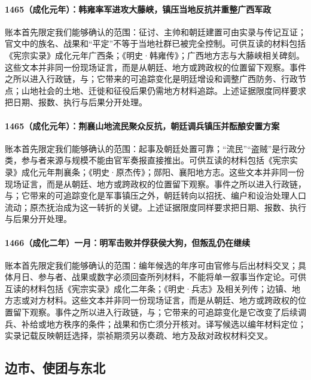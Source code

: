 \paragraph{1465（成化元年）：韩雍率军进攻大藤峡，镇压当地反抗并重整广西军政} 账本首先限定我们能够确认的范围：征讨、主帅和朝廷建置可由实录与传记互证；官文中的族名、战果和“平定”不等于当地社群已被完全控制。可供互读的材料包括《宪宗实录》成化元年广西条；《明史·韩雍传》；广西地方志与大藤峡相关碑刻。这些文本并非同一份现场证言，而是从朝廷、地方或跨政权的位置留下观察。事件之所以进入行政链，与；它带来的可追踪变化是明廷增设和调整广西防务、行政节点；山地社会的土地、迁徙和征役后果仍需地方材料追踪。上述证据限度同样要求把日期、报数、执行与后果分开处理。

\paragraph{1465（成化元年）：荆襄山地流民聚众反抗，朝廷调兵镇压并酝酿安置方案} 账本首先限定我们能够确认的范围：起事及朝廷处置可靠；“流民”“盗贼”是行政分类，参与者来源与规模不能由官军奏报直接推出。可供互读的材料包括《宪宗实录》成化元年荆襄条；《明史·原杰传》；郧阳、襄阳地方志。这些文本并非同一份现场证言，而是从朝廷、地方或跨政权的位置留下观察。事件之所以进入行政链，与；它带来的可追踪变化是军事镇压之外，朝廷转向以招抚、编户和设治处理人口流动；原杰抚治成为这一转折的关键。上述证据限度同样要求把日期、报数、执行与后果分开处理。

\paragraph{1466（成化二年）一月：明军击败并俘获侯大狗，但叛乱仍在继续} 账本首先限定我们能够确认的范围：编年候选的年序可由官修与后出材料交叉；具体月日、参与者、战果或数字必须回查所列材料，不能将单一叙事当作定论。可供互读的材料包括《宪宗实录》成化二年条；《明史·兵志》及相关列传；边镇、地方志或对方材料。这些文本并非同一份现场证言，而是从朝廷、地方或跨政权的位置留下观察。事件之所以进入行政链，与；它带来的可追踪变化是它改变了后续调兵、补给或地方秩序的条件；战果和伤亡须分开核对。译写候选以编年材料定位；实录记载反映朝廷选择，崇祯期须另以奏疏、地方及敌对政权材料交叉。

\subsection{边市、使团与东北}


